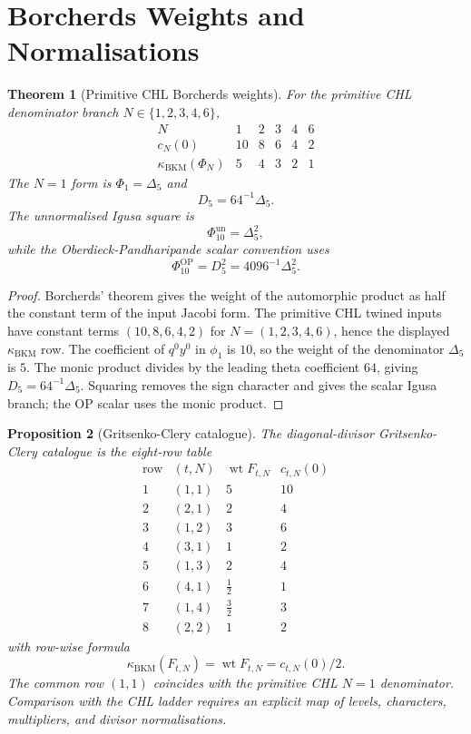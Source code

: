 \documentclass[11pt]{amsart}
\providecommand{\kBKM}{\kappa_{\mathrm{BKM}}}
\theoremstyle{plain}
\newtheorem{theorem}{Theorem}[section]
\newtheorem{proposition}[theorem]{Proposition}
\theoremstyle{definition}
\theoremstyle{remark}
\begin{document}
\section{Borcherds Weights and Normalisations}

\begin{theorem}[Primitive CHL Borcherds weights]\label{thm:primitive-chl-weights}
For the primitive CHL denominator branch
$N\in\{1,2,3,4,6\}$,
\[
\begin{array}{c|ccccc}
N & 1 & 2 & 3 & 4 & 6\\
\hline
c_N(0) & 10 & 8 & 6 & 4 & 2\\
\kBKM(\Phi_N) & 5 & 4 & 3 & 2 & 1
\end{array}
\]
The $N=1$ form is $\Phi_1=\Delta_5$ and
\[
 D_5=64^{-1}\Delta_5 .
\]
The unnormalised Igusa square is
\[
 \Phi_{10}^{\mathrm{un}}=\Delta_5^2 ,
\]
while the Oberdieck-Pandharipande scalar convention uses
\[
 \Phi_{10}^{\mathrm{OP}}=D_5^2=4096^{-1}\Delta_5^2 .
\]
\end{theorem}

\begin{proof}
Borcherds' theorem gives the weight of the automorphic product as half
the constant term of the input Jacobi form. The primitive CHL twined
inputs have constant terms $(10,8,6,4,2)$ for
$N=(1,2,3,4,6)$, hence the displayed $\kBKM$ row. The coefficient
of $q^0y^0$ in $\phi_1$ is $10$, so the weight of the denominator
$\Delta_5$ is $5$. The monic product divides by the leading theta
coefficient $64$, giving $D_5=64^{-1}\Delta_5$. Squaring removes the
sign character and gives the scalar Igusa branch; the OP scalar uses
the monic product.
\end{proof}

\begin{proposition}[Gritsenko-Clery catalogue]\label{prop:gc-catalogue}
The diagonal-divisor Gritsenko-Clery catalogue is the eight-row table
\[
\begin{array}{c|c|c|c}
\text{row} & (t,N) & \operatorname{wt}F_{t,N} & c_{t,N}(0)\\
\hline
1 & (1,1) & 5 & 10\\
2 & (2,1) & 2 & 4\\
3 & (1,2) & 3 & 6\\
4 & (3,1) & 1 & 2\\
5 & (1,3) & 2 & 4\\
6 & (4,1) & \tfrac12 & 1\\
7 & (1,4) & \tfrac32 & 3\\
8 & (2,2) & 1 & 2
\end{array}
\]
with row-wise formula
\[
 \kBKM(F_{t,N})=\operatorname{wt}F_{t,N}=c_{t,N}(0)/2 .
\]
The common row $(1,1)$ coincides with the primitive CHL $N=1$
denominator.
Comparison with the CHL ladder requires an explicit map of levels,
characters, multipliers, and divisor normalisations.
\end{proposition}
\end{document}

